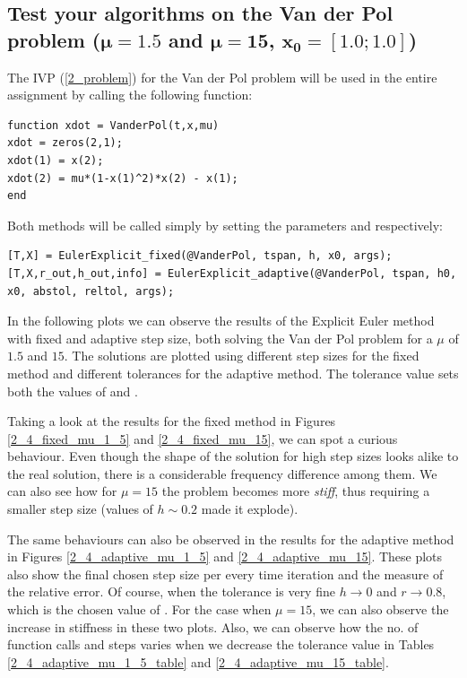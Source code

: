 

\subsection{Test your algorithms on the Van der Pol problem \texorpdfstring{($\mathbf{\mu = 1.5}$ and $\mathbf{\mu = 15}$, $\mathbf{x_0 = [1.0;1.0]}$)}{mu = 1.5 and mu = 15, x0 = [1.0;1.0]}} \label{2_4}
The IVP (\ref{2_problem}) for the Van der Pol problem will be used in the entire assignment by calling the following function:

\begin{lstlisting}[caption = Van der Pol equation, captionpos=b, label=VDP_eq]
function xdot = VanderPol(t,x,mu)
xdot = zeros(2,1);
xdot(1) = x(2);
xdot(2) = mu*(1-x(1)^2)*x(2) - x(1);
end
\end{lstlisting}

Both methods will be called simply by setting the parameters and respectively:
\begin{lstlisting}
[T,X] = EulerExplicit_fixed(@VanderPol, tspan, h, x0, args);
[T,X,r_out,h_out,info] = EulerExplicit_adaptive(@VanderPol, tspan, h0, x0, abstol, reltol, args);
\end{lstlisting}

In the following plots we can observe the results of the Explicit Euler method with fixed and adaptive step size, both solving the Van der Pol problem for a $\mu$ of $1.5$ and $15$. The solutions are plotted using different step sizes for the fixed method and different tolerances for the adaptive method. The tolerance value sets both the values of  and .

Taking a look at the results for the fixed method in Figures \ref{2_4_fixed_mu_1_5} and \ref{2_4_fixed_mu_15}, we can spot a curious behaviour. Even though the shape of the solution for high step sizes looks alike to the real solution, there is a considerable frequency difference among them. We can also see how for $\mu=15$ the problem becomes more \textit{stiff}, thus requiring a smaller step size (values of $h \sim 0.2$ made it explode).

The same behaviours can also be observed in the results for the adaptive method in Figures \ref{2_4_adaptive_mu_1_5} and \ref{2_4_adaptive_mu_15}. These plots also show the final chosen step size per every time iteration and the measure of the relative error. Of course, when the tolerance is very fine $h \to 0$ and $r \to 0.8$, which is the chosen value of . For the case when $\mu = 15$, we can also observe the increase in stiffness in these two plots. Also, we can observe how the no. of function calls and steps varies when we decrease the tolerance value in Tables \ref{2_4_adaptive_mu_1_5_table} and \ref{2_4_adaptive_mu_15_table}.

